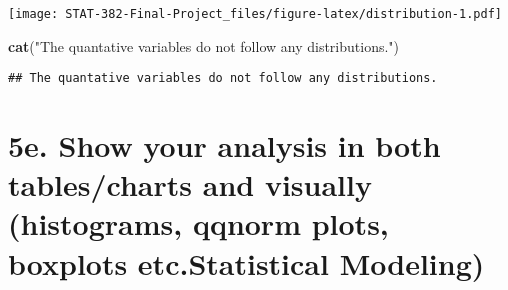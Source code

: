 \documentclass[
]{article}
\newenvironment{Shaded}{\begin{snugshade}}{\end{snugshade}}
\newcommand{\CommentTok}[1]{\textcolor[rgb]{0.56,0.35,0.01}{\textit{#1}}}
\newcommand{\DataTypeTok}[1]{\textcolor[rgb]{0.13,0.29,0.53}{#1}}
\newcommand{\DecValTok}[1]{\textcolor[rgb]{0.00,0.00,0.81}{#1}}
\newcommand{\KeywordTok}[1]{\textcolor[rgb]{0.13,0.29,0.53}{\textbf{#1}}}
\newcommand{\NormalTok}[1]{#1}
\newcommand{\OperatorTok}[1]{\textcolor[rgb]{0.81,0.36,0.00}{\textbf{#1}}}
\newcommand{\StringTok}[1]{\textcolor[rgb]{0.31,0.60,0.02}{#1}}
\begin{document}
\begin{Shaded}
\end{Shaded}

\texttt{[image: STAT-382-Final-Project\_files/figure-latex/distribution-1.pdf]}

\begin{Shaded}
\begin{Highlighting}[]
\KeywordTok{cat}\NormalTok{(}\StringTok{"The quantative variables do not follow any distributions."}\NormalTok{)}
\end{Highlighting}
\end{Shaded}

\begin{verbatim}
## The quantative variables do not follow any distributions.
\end{verbatim}

\hypertarget{e.-show-your-analysis-in-both-tablescharts-and-visually-histograms-qqnorm-plots-boxplots-etc.statistical-modeling}{%
\section{5e. Show your analysis in both tables/charts and visually
(histograms, qqnorm plots, boxplots etc.Statistical
Modeling)}\label{e.-show-your-analysis-in-both-tablescharts-and-visually-histograms-qqnorm-plots-boxplots-etc.statistical-modeling}}
\end{document}
